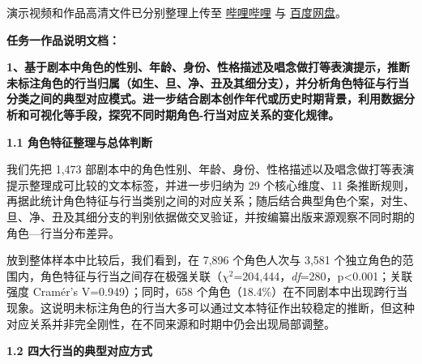 \documentclass[12pt, a4paper]{article}
\begin{document}
{\fontsize{12bp}{20bp}\kaishu
演示视频和作品高清文件已分别整理上传至 \href{https://www.bilibili.com/video/BV1jSjk6oELW/}{哔哩哔哩} 与 \href{https://pan.baidu.com/s/1V7-w7FQtu19aqaoNZouKhw?pwd=szyh}{百度网盘}。
}


{\fontsize{14bp}{22bp}\heiti\bfseries 任务一作品说明文档：}

\vspace{10pt}

{\fontsize{13bp}{20bp}\heiti\bfseries
1、基于剧本中角色的性别、年龄、身份、性格描述及唱念做打等表演提示，推断未标注角色的行当归属（如生、旦、净、丑及其细分支），并分析角色特征与行当分类之间的典型对应模式。进一步结合剧本创作年代或历史时期背景，利用数据分析和可视化等手段，探究不同时期角色-行当对应关系的变化规律。
}

\vspace{6pt}

{\fontsize{13bp}{18bp}\heiti\bfseries 1.1 角色特征整理与总体判断}

\vspace{4pt}

{\fontsize{12bp}{20bp}\kaishu
我们先把 1{,}473 部剧本中的角色性别、年龄、身份、性格描述以及唱念做打等表演提示整理成可比较的文本标签，并进一步归纳为 29 个核心维度、11 条推断规则，再据此统计角色特征与行当类别之间的对应关系；随后结合典型角色个案，对生、旦、净、丑及其细分支的判别依据做交叉验证，并按编纂出版来源观察不同时期的角色—行当分布差异。
}

{\fontsize{12bp}{20bp}\kaishu
放到整体样本中比较后，我们看到，在 7{,}896 个角色人次与 3{,}581 个独立角色的范围内，角色特征与行当之间存在极强关联（\ensuremath{\chi^2}=204{,}444，\textit{df}=280，p<0.001；关联强度 Cramér's V=0.949）；同时，658 个角色（18.4\%）在不同剧本中出现跨行当现象。这说明未标注角色的行当大多可以通过文本特征作出较稳定的推断，但这种对应关系并非完全刚性，在不同来源和时期中仍会出现局部调整。
}

\vspace{6pt}

{\fontsize{13bp}{18bp}\heiti\bfseries 1.2 四大行当的典型对应方式}

\vspace{4pt}
\end{document}
